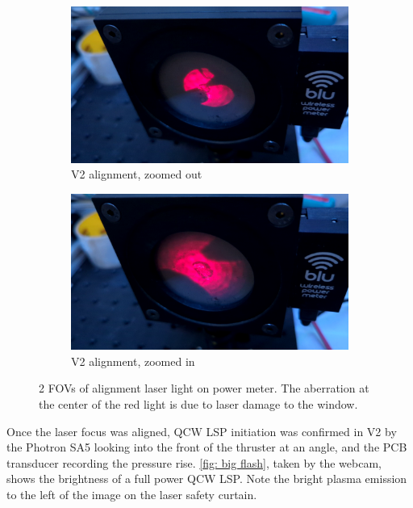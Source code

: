             \begin{figure}[!ht]
                \centering
                \begin{subfigure}[t]{0.45\textwidth}
                    \centering
                    \includegraphics[width=\textwidth]{assets/4 experiments/V2 alignment 1.png}
                    \caption{V2 alignment, zoomed out}
                \end{subfigure}
                \hfill
                \begin{subfigure}[t]{0.45\textwidth}
                    \centering
                    \includegraphics[width=\textwidth]{assets/4 experiments/V2 alignment 2.png}
                    \caption{V2 alignment, zoomed in}
                \end{subfigure}
                \caption{2 FOVs of alignment laser light on power meter. The aberration at the center of the red light is due to laser damage to the window.}
                \label{fig:FOV}
            \end{figure}

            Once the laser focus was aligned, QCW LSP initiation was confirmed in V2 by the Photron SA5 looking into the front of the thruster at an angle, and the PCB transducer recording the pressure rise. \autoref{fig: big flash}, taken by the webcam, shows the brightness of a full power QCW LSP. Note the bright plasma emission to the left of the image on the laser safety curtain.

